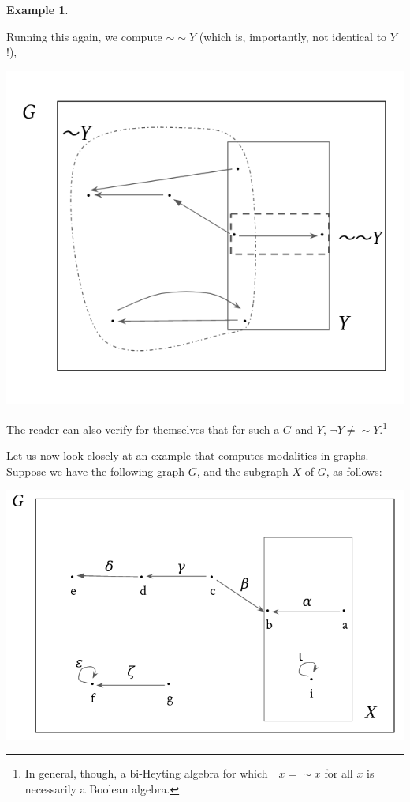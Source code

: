 \documentclass[11pt]{book}
\theoremstyle{definition}
\newtheorem{example}{Example}[section]
\theoremstyle{definition}
\theoremstyle{definition}
\theoremstyle{theorem}
\theoremstyle{definition}
\begin{document}
\begin{example}
\begin{center}
	\end{center}
	Running this again, we compute $\sim \sim Y$ (which is, importantly, not identical to $Y$!),
	\begin{center}
		\includegraphics*[scale=0.3]{GraphNegationAlone3.png}
	\end{center}
	The reader can also verify for themselves that for such a $G$ and $Y$, $\neg Y \neq \sim Y$.\footnote{In general, though, a bi-Heyting algebra for which $\neg x = \sim x$ for all $x$ is necessarily a Boolean algebra.} \par 
	Let us now look closely at an example that computes modalities in graphs. Suppose we have the following graph $G$, and the subgraph $X$ of $G$, as follows: 
	\begin{center}
		\includegraphics*[scale=0.25]{GraphSubgraphNegation1.png}

\end{center}
\end{example}
\end{document}

